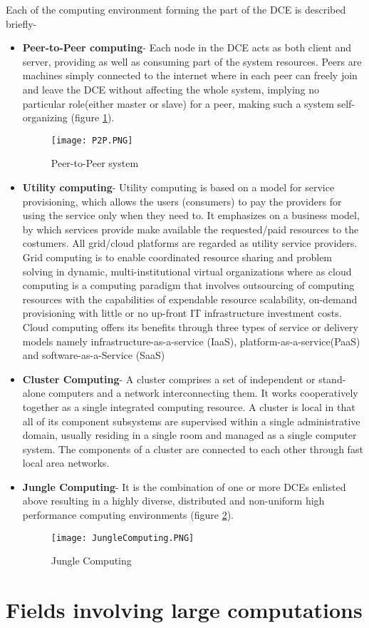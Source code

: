 Each of the computing environment forming the part of the DCE is described briefly-
\begin{itemize}
\item \textbf{Peer-to-Peer computing}- Each node in the DCE acts as both client and server, providing as well as consuming part of the system resources. Peers are machines simply connected to the internet where in each peer can freely join and leave the DCE without affecting the whole system, implying no particular role(either master or slave) for a peer, making such a system self-organizing (figure \ref{fig:P2P}).

\begin{figure}[ht!]
\centering
\texttt{[image: P2P.PNG]}
\caption{Peer-to-Peer system}
\label{fig:P2P}
\end{figure}

\item \textbf{Utility computing}- Utility computing is based on a model for service provisioning, which allows the users (consumers) to pay the providers for using the service only when they need to. It emphasizes on a business model, by which services provide make available the requested/paid resources to the costumers. All grid/cloud platforms are regarded as utility service providers. Grid computing is to enable coordinated resource sharing and problem solving in dynamic, multi-institutional virtual organizations where as cloud computing is a computing paradigm that involves outsourcing of computing resources with the capabilities of expendable resource scalability, on-demand provisioning with little or no up-front IT infrastructure investment costs. Cloud computing offers its benefits through
three types of service or delivery models namely infrastructure-as-a-service (IaaS), platform-as-a-service(PaaS) and software-as-a-Service (SaaS) 

\item \textbf{Cluster Computing}- A cluster comprises a set of independent or stand-alone computers and a network interconnecting them. It
works cooperatively together as a single integrated computing resource. A cluster is local in that all of its component subsystems are supervised within a single administrative domain, usually residing in a single room and managed as a single computer system. The components of a cluster are connected to each other through fast local area networks. 

\item \textbf{Jungle Computing}- It is the combination of one or more DCEs enlisted above resulting in a highly diverse, distributed and non-uniform high performance computing environments (figure \ref{fig:JungleComputing}).  

\begin{figure}[ht!]
\centering
\texttt{[image: JungleComputing.PNG]}
\caption{Jungle Computing}
\label{fig:JungleComputing}
\end{figure}
\end{itemize}

\section{Fields involving large computations}



